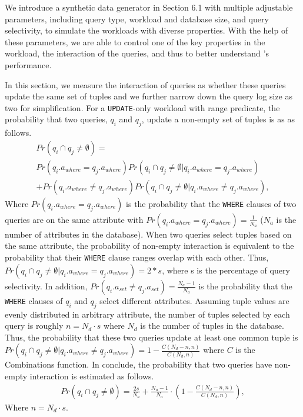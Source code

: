 We introduce a synthetic data generator in Section 6.1 with multiple adjustable parameters, including
query type, workload and database size, and query selectivity, to simulate the workloads with diverse properties. 
With the help of these parameters, we are able to control one of the key properties in the workload, the interaction of the queries, 
and thus to better understand \sys's performance. 

In this section, we measure the interaction of queries as whether these queries update the same set of tuples and we further 
narrow down the query log size as two for simplification. For a \texttt{UPDATE}-only workload with range predicate, 
the probability that two queries, $q_i$ and $q_j$, update a non-empty set of tuples is as as follows.
\begin{multline*}
Pr(q_i\cap q_j \neq \emptyset) =\\ 
Pr(q_i.a_{where}= q_j.a_{where})Pr(q_i\cap q_j \neq \emptyset |q_i.a_{where}= q_j.a_{where}) \\
+ Pr(q_i.a_{where}\neq q_j.a_{where})Pr(q_i\cap q_j \neq \emptyset |q_i.a_{where}\neq q_j.a_{where}), 
\end{multline*}
Where $Pr(q_i.a_{where}= q_j.a_{where})$ is the probability that the \texttt{WHERE} clauses of two queries are on the same attribute with
$Pr(q_i.a_{where}= q_j.a_{where}) = \frac{1}{N_a}$ ($N_a$ is the number of attributes in the database). When two queries select tuples based on the same attribute, 
the probability of non-empty interaction is equivalent to the probability 
that their \texttt{WHERE} clause ranges overlap with each other. Thus, $Pr(q_i\cap q_j \neq \emptyset |q_i.a_{where}= q_j.a_{where}) = 2*s$, where
 s is the percentage of query selectivity. In addition, $Pr(q_i.a_{set}\neq q_j.a_{set}) = \frac{N_a-1}{N_a}$ is the probability that the \texttt{WHERE} clauses
of $q_i$ and $q_j$ select different attributes.  Assuming tuple values are evenly distributed in arbitrary attribute, the number of tuples selected by each query is roughly $n = N_d \cdot s$ where $N_d$ is the number of tuples in the database. Thus, the probability that these two queries update at least one common tuple is $Pr(q_i\cap q_j \neq \emptyset |q_i.a_{where}\neq q_j.a_{where}) = 1 - \frac{C(N_d - n, n)}{C(N_d, n)}$ where $C$ is the Combinations function. In conclude, the probability that two queries have non-empty interaction is estimated as follows.
\begin{multline} \label{eq:pr}
Pr(q_i\cap q_j \neq \emptyset) = \frac{2s}{N_a} + \frac{N_a-1}{N_a} \cdot (1 - \frac{C(N_d - n, n)}{C(N_d, n)}), 
\end{multline}
Where $n = N_d \cdot s$.

